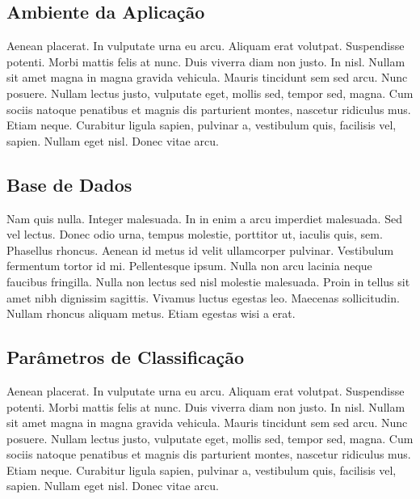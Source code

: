 \subsection{Ambiente da Aplicação}

Aenean placerat. In vulputate urna eu arcu. Aliquam erat volutpat. Suspendisse potenti. Morbi mattis felis at nunc. Duis viverra diam non justo. In nisl. Nullam sit amet magna in magna gravida vehicula. Mauris tincidunt sem sed arcu. Nunc posuere. Nullam lectus justo, vulputate eget, mollis sed, tempor sed, magna. Cum sociis natoque penatibus et magnis dis parturient montes, nascetur ridiculus mus. Etiam neque. Curabitur ligula sapien, pulvinar a, vestibulum quis, facilisis vel, sapien. Nullam eget nisl. Donec vitae arcu.


\subsection{Base de Dados}

Nam quis nulla. Integer malesuada. In in enim a arcu imperdiet malesuada. Sed vel lectus. Donec odio urna, tempus molestie, porttitor ut, iaculis quis, sem. Phasellus rhoncus. Aenean id metus id velit ullamcorper pulvinar. Vestibulum fermentum tortor id mi. Pellentesque ipsum. Nulla non arcu lacinia neque faucibus fringilla. Nulla non lectus sed nisl molestie malesuada. Proin in tellus sit amet nibh dignissim sagittis. Vivamus luctus egestas leo. Maecenas sollicitudin. Nullam rhoncus aliquam metus. Etiam egestas wisi a erat.


\subsection{Parâmetros de Classificação}

Aenean placerat. In vulputate urna eu arcu. Aliquam erat volutpat. Suspendisse potenti. Morbi mattis felis at nunc. Duis viverra diam non justo. In nisl. Nullam sit amet magna in magna gravida vehicula. Mauris tincidunt sem sed arcu. Nunc posuere. Nullam lectus justo, vulputate eget, mollis sed, tempor sed, magna. Cum sociis natoque penatibus et magnis dis parturient montes, nascetur ridiculus mus. Etiam neque. Curabitur ligula sapien, pulvinar a, vestibulum quis, facilisis vel, sapien. Nullam eget nisl. Donec vitae arcu.


